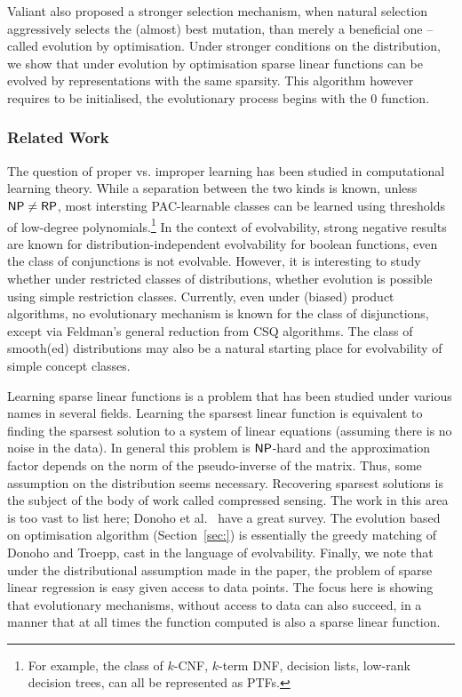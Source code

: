 Valiant also proposed a stronger selection mechanism, when natural selection
aggressively selects the (almost) best mutation, than merely a beneficial one --
called evolution by optimisation.  Under stronger conditions on the
distribution, we show that under evolution by optimisation sparse linear
functions can be evolved by representations with the same sparsity. This
algorithm however requires to be initialised, \ie the evolutionary process
begins with the $0$ function.

\subsubsection*{Related Work}

The question of proper vs. improper learning has been studied in computational
learning theory. While a separation between the two kinds is known, unless $\mathsf{NP}
\neq \mathsf{RP}$, most intersting PAC-learnable classes can be learned using thresholds
of low-degree polynomials.\footnote{For example, the class of $k$-CNF, $k$-term
DNF, decision lists, low-rank decision trees, can all be represented as PTFs.}
In the context of evolvability, strong negative results are known for
distribution-independent evolvability for boolean functions, \eg even the class
of conjunctions is not evolvable. However, it is interesting to study whether
under restricted classes of distributions, whether evolution is possible using
simple restriction classes. Currently, even under (biased) product algorithms,
no evolutionary mechanism is known for the class of disjunctions, except via
Feldman's general reduction from CSQ algorithms. The class of smooth(ed)
distributions may also be a natural starting place for evolvability of simple
concept classes.


Learning sparse linear functions is a problem that has been studied under
various names in several fields. Learning the sparsest linear function is
equivalent to finding the sparsest solution to a system of linear equations
(assuming there is no noise in the data). In general this problem is $\mathsf{NP}$-hard
and the approximation factor depends on the norm of the pseudo-inverse of the
matrix\cite{Natarjan:1995}. Thus, some assumption on the distribution seems
necessary. Recovering sparsest solutions is the subject of the body of work
called compressed sensing. The work in this area is too vast to list here;
Donoho et al.~\cite{Donoho:} have a great survey. The evolution based on
optimisation algorithm (Section~\ref{sec:}) is essentially the greedy matching
of Donoho and Troepp, cast in the language of evolvability. Finally, we note
that under the distributional assumption made in the paper, the problem of
sparse linear regression is easy given access to data points. The focus here is
showing that evolutionary mechanisms, without access to data can also succeed,
in a manner that at all times the function computed is also a sparse linear
function.


